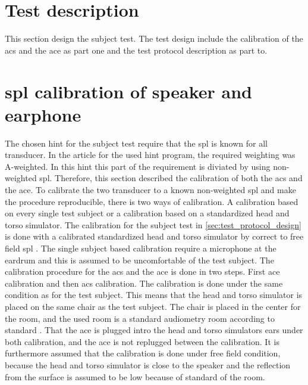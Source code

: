 

\section{Test description}
\label{sec:test_description}
This section design the subject test. The test design include the calibration of the \gls{acs} and the \gls{ace} as part one and the test protocol description as part to. 







\section{\gls{spl} calibration of speaker and earphone}
The chosen \gls{hint} for the subject test require that the \gls{spl} is known for all transducer. In the article for the used \gls{hint} program, the required weighting was A-weighted. In this \gls{hint} this part of the requirement is diviated by using non-weighted \gls{spl}. Therefore, this section described the calibration of both the \gls{acs} and the \gls{ace}. To calibrate the two transducer to a known non-weighted \gls{spl} and make the procedure reproducible, there is two ways of calibration. A calibration based on every single test subject or a calibration based on a standardized head and torso simulator. The calibration for the subject test in \autoref{sec:test_protocol_design}  is done with a calibrated standardized head and torso simulator by correct to free field \gls{spl} \citep{iso_11904-2}. The single subject based calibration require a microphone at the eardrum \citep{iso_11904-1} and this is assumed to be uncomfortable of the test subject. The calibration procedure for the \gls{acs} and the \gls{ace} is done in two steps. First \gls{ace} calibration and then \gls{acs} calibration. The calibration is done under the same condition as for the test subject. This means that the head and torso simulator is placed on the same chair as the test subject. The chair is placed in the center for the room, and the used room is a standard audiometry room according to standard \citep{iso_8253-2}. That the \gls{ace} is plugged intro the head and torso simulators ears under both calibration, and the \gls{ace} is not replugged between the calibration. It is furthermore assumed that the calibration is done under free field condition, because the head and torso simulator is close to the speaker and the reflection from the surface is assumed to be low because of standard of the room. 

